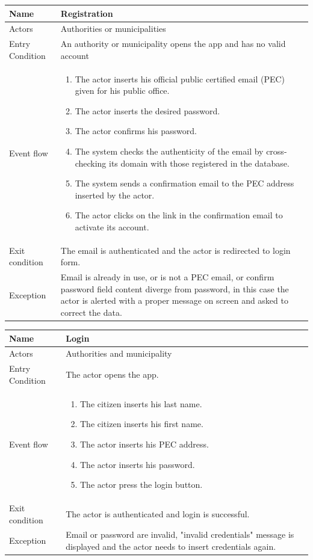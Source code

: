 \vskip 0.2in
\begin{tabular}{|p{3.1cm}|p{11.6cm}|}
\hline
Name & Registration\\
\hline
Actors & Authorities or municipalities\\
\hline
Entry Condition & An authority or municipality opens the app and has no valid account\\
\hline
Event flow & \begin{enumerate}
                \item The actor inserts his official public certified email (PEC) given for his public office.
                \item The actor inserts the desired password.
                \item The actor confirms his password.
                \item The system checks the authenticity of the email by cross-checking its domain with those registered in the database.
                \item The system sends a confirmation email to the PEC address inserted by the actor.
                \item The actor clicks on the link in the confirmation email to activate its account.
            \end{enumerate}\\
\hline
Exit condition & The email is authenticated and the actor is redirected to login form.\\
\hline
Exception & Email is already in use, or is not a PEC email, or confirm password field content diverge from password, in this case the actor is alerted with a proper message on screen and asked to correct the data.\\
\hline
\end{tabular}

\vskip 0.2in
\begin{tabular}{|p{3.1cm}|p{11.6cm}|}
\hline
Name & Login\\
\hline
Actors & Authorities and municipality\\
\hline
Entry Condition & The actor opens the app.\\
\hline
Event flow & \begin{enumerate}
				\item The citizen inserts his last name.
				\item The citizen inserts his first name.
                \item The actor inserts his PEC address.
                \item The actor inserts his password.
                \item The actor press the login button.
            \end{enumerate}\\
\hline
Exit condition & The actor is authenticated and login is successful.\\
\hline
Exception & Email or password are invalid, "invalid credentials" message is displayed and the actor needs to insert credentials again.\\
\hline
\end{tabular}

